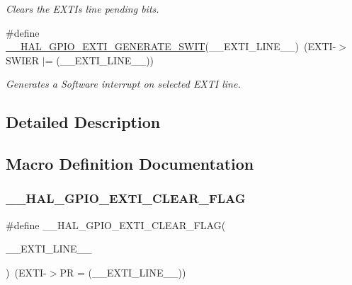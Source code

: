 \begin{DoxyCompactItemize}
\begin{DoxyCompactList}\small\item\em Clears the E\+X\+TI\textquotesingle{}s line pending bits. \end{DoxyCompactList}\item 
\#define \mbox{\hyperlink{group___g_p_i_o___exported___macros_gac50aef6881e1f76032941ead9c9bce61}{\+\_\+\+\_\+\+H\+A\+L\+\_\+\+G\+P\+I\+O\+\_\+\+E\+X\+T\+I\+\_\+\+G\+E\+N\+E\+R\+A\+T\+E\+\_\+\+S\+W\+IT}}(\+\_\+\+\_\+\+E\+X\+T\+I\+\_\+\+L\+I\+N\+E\+\_\+\+\_\+)~(E\+X\+TI-\/$>$S\+W\+I\+ER $\vert$= (\+\_\+\+\_\+\+E\+X\+T\+I\+\_\+\+L\+I\+N\+E\+\_\+\+\_\+))
\begin{DoxyCompactList}\small\item\em Generates a Software interrupt on selected E\+X\+TI line. \end{DoxyCompactList}\end{DoxyCompactItemize}


\subsection{Detailed Description}


\subsection{Macro Definition Documentation}
\mbox{\label{group___g_p_i_o___exported___macros_ga2f28fc349d1812cdc55a77c68d2b278d}} 
\subsubsection{\texorpdfstring{\_\_HAL\_GPIO\_EXTI\_CLEAR\_FLAG}{\_\_HAL\_GPIO\_EXTI\_CLEAR\_FLAG}}
{\footnotesize\ttfamily \#define \+\_\+\+\_\+\+H\+A\+L\+\_\+\+G\+P\+I\+O\+\_\+\+E\+X\+T\+I\+\_\+\+C\+L\+E\+A\+R\+\_\+\+F\+L\+AG(\begin{DoxyParamCaption}\item[{}]{\+\_\+\+\_\+\+E\+X\+T\+I\+\_\+\+L\+I\+N\+E\+\_\+\+\_\+ }\end{DoxyParamCaption})~(E\+X\+TI-\/$>$PR = (\+\_\+\+\_\+\+E\+X\+T\+I\+\_\+\+L\+I\+N\+E\+\_\+\+\_\+))}



